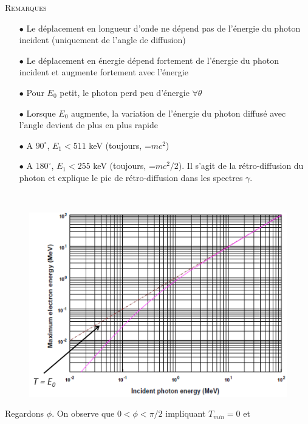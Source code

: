 \newpage
\textsc{Remarques}
\begin{itemize}
\item[$\bullet$] Le déplacement en longueur d'onde ne dépend pas de l'énergie du photon incident 
(uniquement de l'angle de diffusion)
\item[$\bullet$] Le déplacement en énergie dépend fortement de l'énergie du photon incident et 
augmente fortement avec l'énergie
\item[$\bullet$] Pour $E_0$ petit, le photon perd peu d'énergie $\forall\theta$
\item[$\bullet$] Lorsque $E_0$ augmente, la variation de l'énergie du photon diffusé avec l'angle
 devient de plus en plus rapide
\item[$\bullet$] A $90^\circ$, $E_1 < 511$ keV (toujours, =$mc^2$)
\item[$\bullet$] A $180^\circ$, $E_1 < 255$ keV (toujours, =$mc^2/2$). Il s'agit de la
rétro-diffusion du photon et explique le pic de rétro-diffusion dans les spectres $\gamma$.
\end{itemize}\ 

	\begin{figure}
	\vspace{-7mm}
	\includegraphics[scale=0.5]{ch4/image4}
	\end{figure}
	
Regardons $\phi$. On observe que $0<\phi<\pi/2$ impliquant $T_{min}=0$ et \\

\ \\

